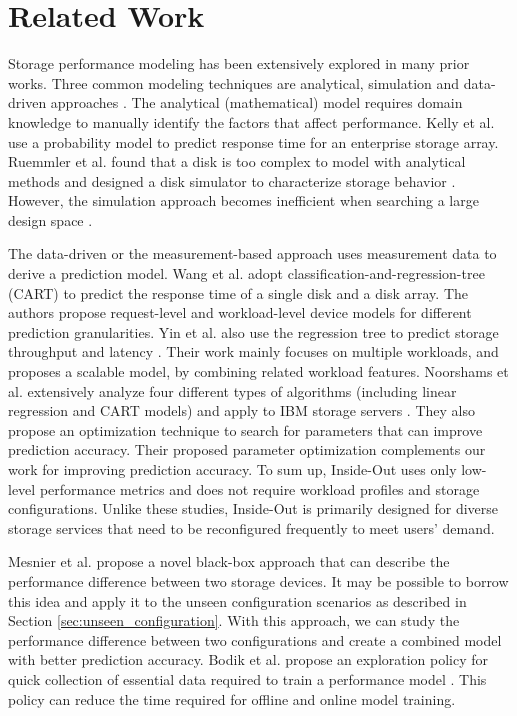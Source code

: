 \section{Related Work}
\label{ch4:sec:relatedwork}

Storage performance modeling has been extensively explored in many prior works. 
Three common modeling techniques are analytical, simulation and data-driven approaches \cite{Shriver1998, Kelly2004, Ardagna2014}.
The analytical (mathematical) model requires domain knowledge to manually identify the factors that affect performance\cite{Shriver1998, Kelly2004}.
Kelly et al. use a probability model to predict response time for an enterprise storage array.
Ruemmler et al. found that a disk is too complex to model with analytical methods and designed a disk simulator to characterize storage behavior \cite{Ruemmler1994}.
However, the simulation approach becomes inefficient when searching a large design space \cite{Kelly2004}.


The data-driven or the measurement-based approach
uses measurement data to derive a prediction model. 
Wang et al. \cite{Wang2004} adopt classification-and-regression-tree (CART) to predict the response time of a single disk and a disk array.
The authors propose request-level and workload-level device models for different prediction granularities.
Yin et al. also use the regression tree to predict storage throughput and latency \cite{Yin2006}.
Their work mainly focuses on multiple workloads, and proposes a scalable model, by combining related workload features.
Noorshams et al. extensively analyze four different types of algorithms 
(including linear regression and CART models) and apply to IBM storage servers \cite{Noorshams2013}.
They also propose an optimization technique to search for parameters that can improve prediction accuracy.
Their proposed parameter optimization complements our work for improving prediction accuracy.
To sum up, Inside-Out uses only low-level performance metrics and does not require workload profiles and storage configurations.
Unlike these studies, Inside-Out is primarily designed for diverse storage services that need to be reconfigured frequently to meet users' demand. 


Mesnier et al. \cite{Mesnier2007} propose a novel black-box approach that can describe the performance difference between two storage devices.
It may be possible to borrow this idea and apply it to the unseen configuration scenarios as described in Section \ref{sec:unseen_configuration}.
With this approach, we can study the performance difference between two configurations and create a combined model with better prediction accuracy.
Bodik et al. propose an exploration policy for quick collection of essential data required to train a performance model \cite{Bodik2009}.
This policy can reduce the time required for offline and online model training.


